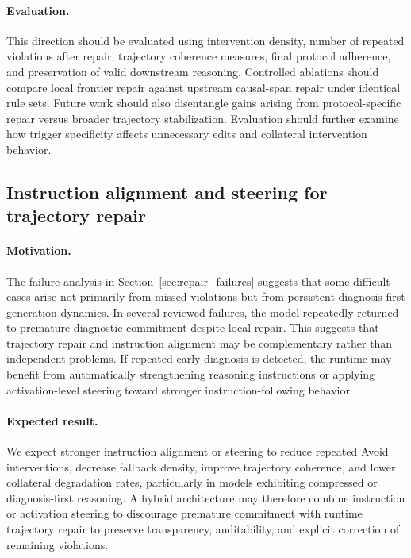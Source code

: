 \documentclass[twocolumn]{article}
\begin{document}
\paragraph{Evaluation.}
This direction should be evaluated using intervention density, number of
repeated violations after repair, trajectory coherence measures, final protocol
adherence, and preservation of valid downstream reasoning. Controlled ablations
should compare local frontier repair against upstream causal-span repair under
identical rule sets. Future work should also disentangle gains arising from
protocol-specific repair versus broader trajectory stabilization. Evaluation
should further examine how trigger specificity affects unnecessary edits and
collateral intervention behavior.

\subsection{Instruction alignment and steering for trajectory repair}

\paragraph{Motivation.}
The failure analysis in Section~\ref{sec:repair_failures} suggests that some
difficult cases arise not primarily from missed violations but from persistent
diagnosis-first generation dynamics. In several reviewed failures, the model
repeatedly returned to premature diagnostic commitment despite local repair.
This suggests that trajectory repair and instruction alignment may be
complementary rather than independent problems. If repeated early diagnosis is
detected, the runtime may benefit from automatically strengthening reasoning
instructions or applying activation-level steering toward stronger
instruction-following behavior
\parencite{stolfo2025activationsteering}.

\paragraph{Expected result.}
We expect stronger instruction alignment or steering to reduce repeated Avoid
interventions, decrease fallback density, improve trajectory coherence, and
lower collateral degradation rates, particularly in models exhibiting compressed
or diagnosis-first reasoning. A hybrid architecture may therefore combine
instruction or activation steering to discourage premature commitment with
runtime trajectory repair to preserve transparency, auditability, and explicit
correction of remaining violations.
\end{document}
